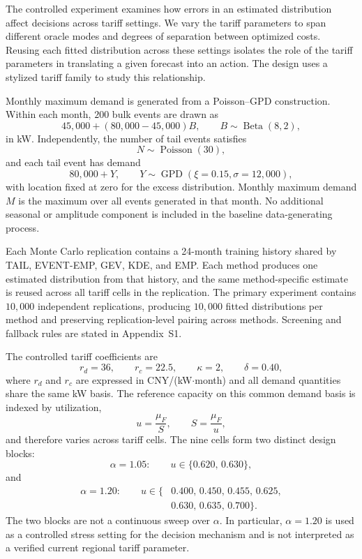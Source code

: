 \documentclass[Times1COL]{WileyNJDv5}
\begin{document}
The controlled experiment examines how errors in an estimated distribution affect decisions across tariff settings. We vary the tariff parameters to span different oracle modes and degrees of separation between optimized costs. Reusing each fitted distribution across these settings isolates the role of the tariff parameters in translating a given forecast into an action. The design uses a stylized tariff family to study this relationship.

Monthly maximum demand is generated from a Poisson--GPD construction. Within each month, $200$ bulk events are drawn as
\[
45{,}000
+(80{,}000-45{,}000)B,
\qquad
B\sim\operatorname{Beta}(8,2),
\]
in kW. Independently, the number of tail events satisfies
\[
N\sim\operatorname{Poisson}(30),
\]
and each tail event has demand
\[
80{,}000+Y,
\qquad
Y\sim\operatorname{GPD}(\xi=0.15,\sigma=12{,}000),
\]
with location fixed at zero for the excess distribution. Monthly maximum demand $M$ is the maximum over all events generated in that month. No additional seasonal or amplitude component is included in the baseline data-generating process.

Each Monte Carlo replication contains a 24-month training history shared by TAIL, EVENT-EMP, GEV, KDE, and EMP. Each method produces one estimated distribution from that history, and the same method-specific estimate is reused across all tariff cells in the replication. The primary experiment contains $10{,}000$ independent replications, producing $10{,}000$ fitted distributions per method and preserving replication-level pairing across methods. Screening and fallback rules are stated in Appendix~S1.

The controlled tariff coefficients are
\[
r_d=36,\qquad
r_c=22.5,\qquad
\kappa=2,\qquad
\delta=0.40,
\]
where $r_d$ and $r_c$ are expressed in CNY/(kW$\cdot$month) and all
demand quantities share the same kW basis.
The reference capacity on this common demand basis is indexed by utilization,
\[
u=\frac{\mu_F}{S},
\qquad
S=\frac{\mu_F}{u},
\]
and therefore varies across tariff cells. The nine cells form two distinct design blocks:
\[
\alpha=1.05:
\qquad
u\in\{0.620,\,0.630\},
\]
and
\[
\begin{aligned}
\alpha=1.20:\qquad
u\in\{&0.400,\,0.450,\,0.455,\,0.625,\\
&0.630,\,0.635,\,0.700\}.
\end{aligned}
\]
The two blocks are not a continuous sweep over $\alpha$. In particular, $\alpha=1.20$ is used as a controlled stress setting for the decision mechanism and is not interpreted as a verified current regional tariff parameter.
\end{document}
